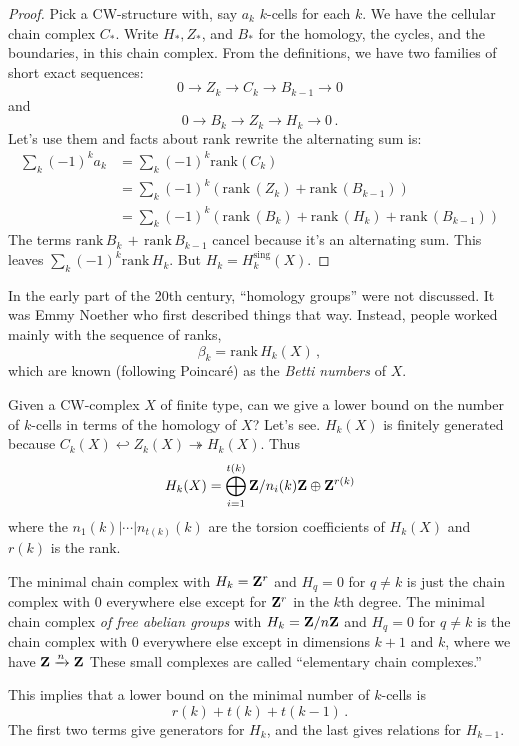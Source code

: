 \begin{proof}
Pick a CW-structure with, say $a_k$ $k$-cells for each $k$. We have the 
cellular chain complex $C_*$. Write $H_*,Z_*$, and $B_*$ for the homology,
the cycles, and the boundaries, in this chain complex. From the definitions, 
we have two families of short exact sequences: 
\[
0\to Z_k\to C_k\to B_{k-1}\to 0
\]
and
\[
0\to B_k\to Z_k\to H_k\to 0\,.
\]
Let's use them and facts about rank rewrite the alternating sum is:
\begin{align*}
\sum_k (-1)^ka_k & = \sum_k(-1)^k\mathrm{rank}(C_k)\\
& = \sum_k(-1)^k(\mathrm{rank}\,(Z_k)+\mathrm{rank}\,(B_{k-1}))\\
& = \sum_k(-1)^k(\mathrm{rank}\,(B_k)+\mathrm{rank}\,(H_k)+
\mathrm{rank}\,(B_{k-1}))
\end{align*}
The terms $\mathrm{rank}\,B_k\,+\,\mathrm{rank}\,B_{k-1}$ cancel because it's an alternating sum. This leaves $\sum_k(-1)^k\mathrm{rank}\,H_k$. But $H_k= H_k^\text{sing}(X)$.
\end{proof}

In the early part of the 20th century, ``homology groups'' were not discussed. 
It was Emmy Noether who first described things that way. Instead, 
people worked mainly with the sequence of ranks, 
\[
\beta_k=\mathrm{rank}\,H_k(X)\,,
\]
which are known (following Poincar\'e) as the {\em Betti numbers} of $X$.

Given a CW-complex $X$ of finite type, can we give a lower bound on the number of $k$-cells in terms of the homology of $X$? Let's see. $H_k(X)$ is finitely generated because $C_k(X)\hookleftarrow Z_k(X)\twoheadrightarrow H_k(X)$. Thus 
\[
H_k(X)=\bigoplus^{t(k)}_{i=1}\mathbf Z/n_i(k)\mathbf Z\oplus \mathbf Z^{r(k)}
\]
where the $n_1(k)|\cdots|n_{t(k)}(k)$ are the torsion coefficients of $H_k(X)$ 
and $r(k)$ is the rank.

The minimal chain complex with $H_k=\mathbf Z^r$ and $H_q=0$ for $q\neq k$ is just the chain complex with $0$ everywhere else except for $\mathbf Z^r$ in the $k$th degree. The minimal chain complex {\em of free abelian groups} with $ H_k=\mathbf Z/n\mathbf Z$ and $ H_q=0$ for $q\neq k$ is the chain complex with $0$ everywhere else except in dimensions $k+1$ and $k$, where we have $\mathbf Z\xrightarrow{n}\mathbf Z$ 
These small complexes are called ``elementary chain complexes.''

This implies that
a lower bound on the minimal number of $k$-cells is 
\[
r(k)+t(k)+t(k-1)\,.
\]
The first two terms give generators for $H_k$, and the last gives relations
for $H_{k-1}$.

